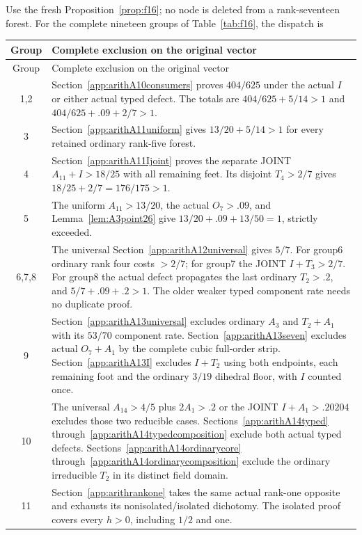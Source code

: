 Use the fresh
Proposition~\ref{prop:f16};
no node is deleted from a
rank-seventeen forest.
For the complete nineteen groups
of Table~\ref{tab:f16}, the dispatch is
\begin{longtable}{cp{10.3cm}}
\toprule Group&Complete exclusion on the original vector\\\midrule\endfirsthead
\toprule Group&Complete exclusion on the original vector\\\midrule\endhead
1,2&Section~\ref{app:arithA10consumers}
proves \(404/625\) under the actual
\(I\) or either actual typed defect.
The totals are \(404/625+5/14>1\)
and \(404/625+.09+2/7>1\).\\
3&Section~\ref{app:arithA11uniform}
gives \(13/20+5/14>1\) for every
retained ordinary rank-five forest.\\
4&Section~\ref{app:arithA11Ijoint}
proves the separate JOINT
\(A_{11}+I>18/25\) with all remaining
feet. Its disjoint \(T_4>2/7\)
gives \(18/25+2/7=176/175>1\).\\
5&The uniform \(A_{11}>13/20\),
the actual \(O_7>.09\), and
Lemma~\ref{lem:A3point26}
give \(13/20+.09+13/50=1\),
strictly exceeded.\\
6,7,8&The universal
Section~\ref{app:arithA12universal}
gives \(5/7\).
For group6 ordinary rank four
costs \(>2/7\); for group7 the
JOINT \(I+T_3>2/7\).
For group8 the actual defect
propagates the last ordinary
\(T_2>.2\), and
\(5/7+.09+.2>1\).
The older weaker typed component
rate needs no duplicate proof.\\
9&Section~\ref{app:arithA13universal}
excludes ordinary \(A_3\) and
\(T_2+A_1\) with its \(53/70\)
component rate.
Section~\ref{app:arithA13seven}
excludes actual \(O_7+A_1\) by
the complete cubic full-order strip.
Section~\ref{app:arithA13I}
excludes \(I+T_2\) using both
endpoints, each remaining foot
and the ordinary \(3/19\) dihedral
floor, with \(I\) counted once.\\
10&The universal \(A_{14}>4/5\)
plus \(2A_1>.2\) or the JOINT
\(I+A_1>.20204\) excludes those
two reducible cases.
Sections~\ref{app:arithA14typed}
through~\ref{app:arithA14typedcomposition}
exclude both actual typed defects.
Sections~\ref{app:arithA14ordinarycore}
through~\ref{app:arithA14ordinarycomposition}
exclude the ordinary irreducible
\(T_2\) in its distinct field domain.\\
11&Section~\ref{app:arithrankone}
takes the same actual rank-one
opposite and exhausts its
nonisolated/isolated dichotomy.
The isolated proof covers every
\(h>0\), including \(1/2\) and one.\\

\end{longtable}
